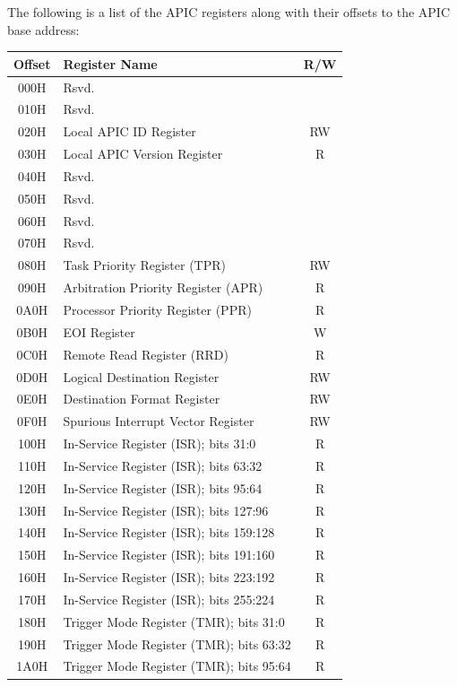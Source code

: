 \documentclass{article}
\begin{document}
The following is a list of the APIC registers along with their offsets to the APIC base address:
\begin{longtable}{|c|l|c|}
  \hline \textbf{Offset} & \textbf{Register Name} & \textbf{R/W} \\ \hline
  \endhead

  \hline
  \endfoot

  000H & Rsvd. & \\
  010H & Rsvd. & \\
  020H & Local APIC ID Register & RW \\
  030H & Local APIC Version Register & R \\
  040H & Rsvd. & \\
  050H & Rsvd. & \\
  060H & Rsvd. & \\
  070H & Rsvd. & \\
  080H & Task Priority Register (TPR) & RW \\
  090H & Arbitration Priority Register (APR) & R \\
  0A0H & Processor Priority Register (PPR) & R \\
  0B0H & EOI Register & W \\
  0C0H & Remote Read Register (RRD) & R \\
  0D0H & Logical Destination Register & RW \\
  0E0H & Destination Format Register & RW \\
  0F0H & Spurious Interrupt Vector Register & RW \\
  100H & In-Service Register (ISR); bits 31:0 & R \\
  110H & In-Service Register (ISR); bits 63:32 & R \\
  120H & In-Service Register (ISR); bits 95:64 & R \\
  130H & In-Service Register (ISR); bits 127:96 & R \\
  140H & In-Service Register (ISR); bits 159:128 & R \\
  150H & In-Service Register (ISR); bits 191:160 & R \\
  160H & In-Service Register (ISR); bits 223:192 & R \\
  170H & In-Service Register (ISR); bits 255:224 & R \\
  180H & Trigger Mode Register (TMR); bits 31:0 & R \\
  190H & Trigger Mode Register (TMR); bits 63:32 & R \\
  1A0H & Trigger Mode Register (TMR); bits 95:64 & R \\

\end{longtable}
\end{document}
